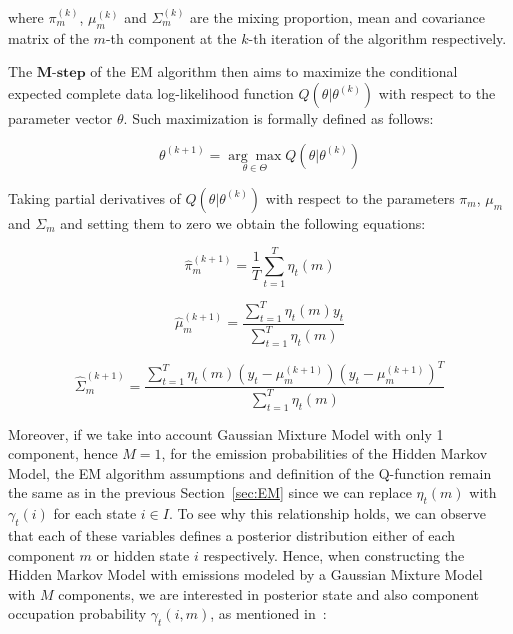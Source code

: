 where $\pi_m^{(k)}$, $\mu_m^{(k)}$ and $\Sigma_m^{(k)}$ are the mixing proportion, mean and covariance matrix of the $m$-th component at the $k$-th iteration of the algorithm respectively.

The $\textbf{M-step}$ of the EM algorithm then aims to maximize the conditional expected complete data log-likelihood function $Q(\theta|\theta^{(k)})$ with respect to the parameter vector $\theta$.
Such maximization is formally defined as follows:

\begin{equation}
    \theta^{(k+1)} = \underset{\theta \in \Theta}{\arg\max} Q(\theta|\theta^{(k)})
\end{equation}

Taking partial derivatives of $Q(\theta|\theta^{(k)})$ with respect to the parameters $\pi_m$, $\mu_m$ and $\Sigma_m$ and setting them to zero we obtain the following equations:

\begin{equation} \label{eq:mixing_proportion}
    \hat{\pi}_m^{(k+1)} = \frac{1}{T} \sum_{t=1}^{T} \eta_t(m)
\end{equation}

\begin{equation} \label{eq:mean_vector}
    \hat{\mu}_m^{(k+1)} = \frac{\sum_{t=1}^{T} \eta_t(m) y_t}{\sum_{t=1}^{T} \eta_t(m)}
\end{equation}

\begin{equation} \label{eq:covariance_matrix}
    \hat{\Sigma}_m^{(k+1)} = \frac{\sum_{t=1}^{T} \eta_t(m)(y_t - \mu_m^{(k+1)}){(y_t - \mu_m^{(k+1)})}^T}{\sum_{t=1}^{T} \eta_t(m)}
\end{equation}

\noindent Moreover, if we take into account Gaussian Mixture Model with only 1 component, hence $M = 1$, for the emission probabilities of the Hidden Markov Model, the EM algorithm assumptions and definition of the Q-function remain 
the same as in the previous Section~\ref{sec:EM} since we can replace $\eta_t(m)$ with $\gamma_t(i)$ for each state $i \in I$. To see why this relationship holds, we can observe that each of these variables defines
a posterior distribution either of each component $m$ or hidden state $i$ respectively. Hence, when constructing the Hidden Markov Model with emissions modeled by 
a Gaussian Mixture Model with $M$ components, we are interested in posterior state and also component occupation probability $\gamma_t(i,m)$, as mentioned in~\citep{Aigner2022}:


